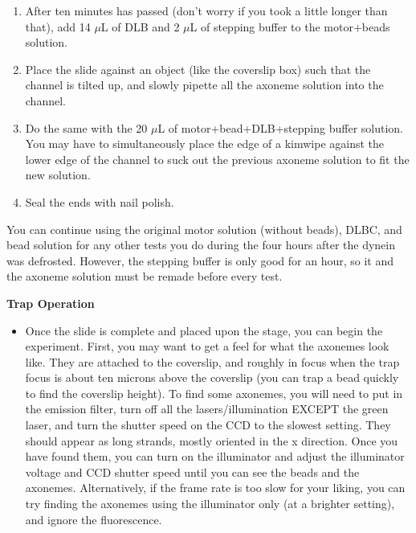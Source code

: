 \documentclass{../lab}
\begin{document}
\begin{enumerate}
    \item After ten minutes has passed (don't worry if you took a little longer than that), add 14 $ \mu $L of DLB and 2 $ \mu $L of stepping buffer to the motor+beads solution.

    \item Place the slide against an object (like the coverslip box) such that the channel is tilted up, and slowly pipette all the axoneme solution into the channel.

    \item Do the same with the 20 $ \mu $L of motor+bead+DLB+stepping buffer solution. You may have to simultaneously place the edge of a kimwipe against the lower edge of the channel to suck out the previous axoneme solution to fit the new solution.

    \item Seal the ends with nail polish.

\end{enumerate}

You can continue using the original motor solution (without beads), DLBC, and bead solution for any other tests you do during the four hours after the dynein was defrosted. However, the stepping buffer is only good for an hour, so it and the axoneme solution must be remade before every test.

\textbf{Trap Operation}\begin{itemize}
    \item Once the slide is complete and placed upon the stage, you can begin the experiment. First, you may want to get a feel for what the axonemes look like. They are attached to the coverslip, and roughly in focus when the trap focus is about ten microns above the coverslip (you can trap a bead quickly to find the coverslip height). To find some axonemes, you will need to put in the emission filter, turn off all the lasers/illumination EXCEPT the green laser, and turn the shutter speed on the CCD to the slowest setting. They should appear as long strands, mostly oriented in the x direction. Once you have found them, you can turn on the illuminator and adjust the illuminator voltage and CCD shutter speed until you can see the beads and the axonemes. Alternatively, if the frame rate is too slow for your liking, you can try finding the axonemes using the illuminator only (at a brighter setting), and ignore the fluorescence.

\end{itemize}
\end{document}
